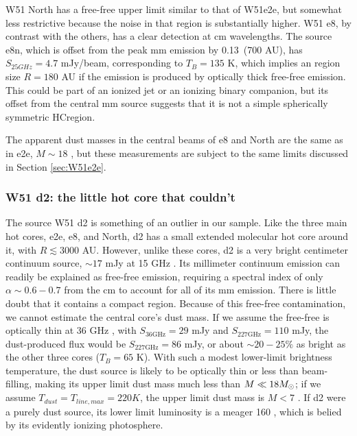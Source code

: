 \documentclass{emulateapj}
\begin{document}
W51 North has a free-free upper limit similar to that of W51e2e, but somewhat less
restrictive because the noise in that region is substantially higher.  W51 e8,
by contrast with the others, has a clear detection at cm wavelengths.  The
source e8n, which is offset from the peak mm emission by 0.13\arcsec\ (700 AU),
has $S_{25 GHz}=4.7$ mJy/beam, corresponding to $T_B=135$ K, which implies an
\hii region size $R=180$ AU if the emission is produced by  optically thick
free-free emission.  This could be part of an ionized jet or an ionizing binary
companion, but its offset from the central mm source
suggests that it is not a simple spherically symmetric HC\hii region.

The apparent dust masses in the central beams of e8 and North are the same
as in e2e, $M\sim18$ \msun, but these measurements are subject to the same
limits discussed in Section \ref{sec:W51e2e}.

\subsubsection{W51 d2: the little hot core that couldn't}
\label{sec:w51d2}
The source W51 d2 is something of an outlier in our sample.  Like the three
main hot cores, e2e, e8, and North, d2 has a small extended molecular hot core
around it, with $R\lesssim3000$ AU.  However, unlike these cores, d2 is a very
bright centimeter continuum source, $\sim17$ mJy at 15 GHz
\citep{Ginsburg2016a}.  Its millimeter continuum emission can readily be
explained as free-free emission, requiring a spectral index of only
$\alpha\sim0.6-0.7$ from the cm to account for all of its mm emission.  There
is little doubt that it contains a compact \hii region.  Because of this free-free
contamination, we cannot estimate the central core's dust mass.  If we assume
the free-free is optically thin at 36 GHz \citep[the highest-frequency cm-wave
measurement
we have available][]{Goddi2015b}, with $S_{36 \mathrm{GHz}} = 29$ mJy and
$S_{227 \mathrm{GHz}}=110$
mJy, the dust-produced flux would be $S_{227 \mathrm{GHz}} = 86$ mJy, or about
$\sim20-25\%$ as bright as the other three cores ($T_{B}=65$ K).  With such a modest
lower-limit brightness temperature, the dust source is likely to be optically
thin or less than beam-filling, making its upper limit dust mass much less than
$M\ll18M_{\odot}$; if we assume $T_{dust} = T_{line,max} = 220 K$, the upper limit
dust mass is $M<7$ \msun.  If d2 were a purely dust source, its lower limit
luminosity is a meager 160 \lsun, which is belied by its evidently ionizing
photosphere.
\end{document}
